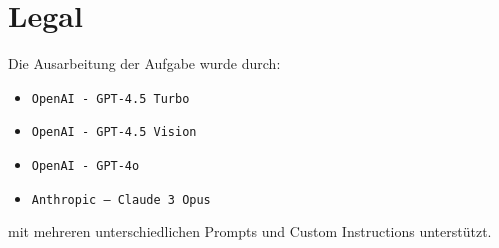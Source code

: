 \documentclass[a4paper,11pt]{report}
\begin{document}
    \chapter{Legal}
    \label{ch:legal}
    Die Ausarbeitung der Aufgabe wurde durch:

    \begin{itemize}
        \item \texttt{OpenAI - GPT-4.5 Turbo}
        \item \texttt{OpenAI - GPT-4.5 Vision}
        \item \texttt{OpenAI - GPT-4o}
        \item \texttt{Anthropic -- Claude 3 Opus}
    \end{itemize}

    mit mehreren unterschiedlichen Prompts und Custom Instructions unterstützt.
\end{document}
